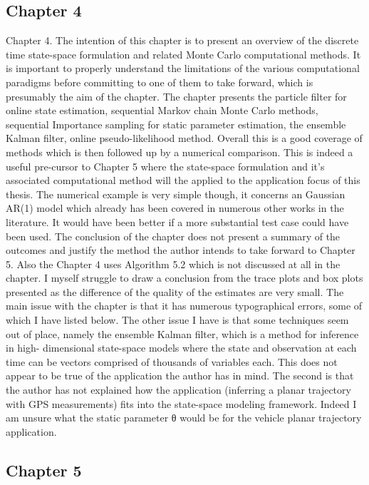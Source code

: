 \documentclass[a4paper,18pt]{extarticle}
\begin{document}
\subsection{Chapter 4}
Chapter 4. The intention of this chapter is to present an overview of the discrete time state-space formulation and related Monte Carlo computational methods. It is important to properly understand the limitations of the various computational paradigms before committing to one of them to take forward, which is presumably the aim of the chapter. 
The chapter presents the particle filter for online state estimation, sequential Markov chain Monte Carlo methods, sequential Importance sampling for static parameter estimation, the ensemble Kalman filter, online pseudo-likelihood method. Overall this is a good coverage of methods which is then followed up by a numerical comparison. This is indeed a useful pre-cursor to Chapter 5 where the state-space formulation and it’s associated computational method will the applied to the application focus of this thesis. The numerical example is very simple though, it concerns an Gaussian AR(1) model which already has been covered in numerous other works in the literature. It would have been better if a more substantial test case could have been used. The conclusion of the chapter does not present a summary of the outcomes and justify the method the author intends to take forward to Chapter 5. Also the Chapter 4 uses Algorithm 5.2 which is not discussed at all in the chapter. I myself struggle to draw a conclusion from 
the trace plots and box plots presented as the difference of the quality of the estimates are very small. 
The main issue with the chapter is that it has numerous typographical errors, some of which I have listed below. The other issue I have is that some techniques seem out of place, namely the ensemble Kalman filter, which is a method for inference in high- dimensional state-space models where the state and observation at each time can be vectors comprised of thousands of variables each. This does not appear to be true of the application the author has in mind. The second is that the author has not explained how the application (inferring a planar trajectory with GPS measurements) fits into the state-space modeling framework. Indeed I am unsure what the static parameter θ would be for the vehicle planar trajectory application.

\subsection{Chapter 5}
\end{document}

